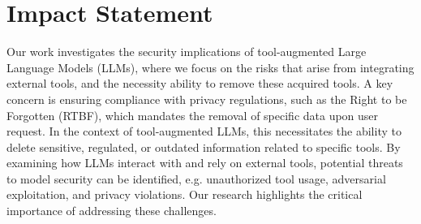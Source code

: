 

\section*{Impact Statement}
Our work investigates the security implications of tool-augmented Large Language Models (LLMs), where we focus on the risks that arise from integrating external tools, and the necessity ability to remove these acquired tools. 
A key concern is ensuring compliance with privacy regulations, such as the Right to be Forgotten (RTBF), which mandates the removal of specific data upon user request. In the context of tool-augmented LLMs, this necessitates the ability to delete sensitive, regulated, or outdated information related to specific tools. 
By examining how LLMs interact with and rely on external tools, potential threats to model security can be identified, e.g. unauthorized tool usage, adversarial exploitation, and privacy violations. Our research highlights the critical importance of addressing these challenges.
